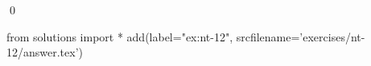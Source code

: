 
\begin{ex} 
  \label{ex:nt-12}
  
  \qed
\end{ex} 
\begin{python0}
from solutions import *
add(label="ex:nt-12",
    srcfilename='exercises/nt-12/answer.tex') 
\end{python0}
